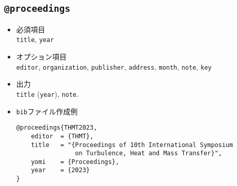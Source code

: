 \documentclass[a4paper,fleqn,uplatex,dvipdfmx]{jsarticle}
\makeatletter
\newcommand{\ttproceedings}{\texttt{@proceedings}}
\makeatother
\begin{document}
\subsection{\ttproceedings}
\label{ssec:proceedings}
\begin{screen}
    \begin{itemize}
        \item 必須項目 \\
        \verb|title|, \verb|year|
        \item オプション項目 \\
        \verb|editor|, \verb|organization|, \verb|publisher|, \verb|address|, \verb|month|, \verb|note|, \verb|key|
        \item 出力 \\
            \colorbox[gray]{0.8}{\texttt{title}} (\colorbox[gray]{0.8}{\texttt{year}}), \colorbox[gray]{0.8}{\texttt{note}}.
        \item \verb|bib|ファイル作成例 \vspace{-3mm}
\begin{verbatim}
@proceedings{THMT2023,
    editor  = {THMT},
    title   = "{Proceedings of 10th International Symposium 
                on Turbulence, Heat and Mass Transfer}",
    yomi    = {Proceedings},
    year    = {2023}
}
\end{verbatim}
    \end{itemize}
\end{screen}
\end{document}
